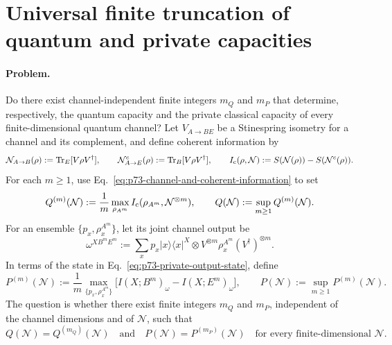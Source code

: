 \section{Universal finite truncation of quantum and private capacities}
\label{sec:problem-73}

\paragraph{Problem.}
Do there exist channel-independent finite integers $m_Q$ and $m_P$ that
determine, respectively, the quantum capacity and the private classical
capacity of every finite-dimensional quantum channel?  Let $V_{A\to BE}$ be
a Stinespring isometry for a channel and its
complement, and define coherent information by
\begin{equation}
  \mathcal N_{A\to B}(\rho):=\operatorname{Tr}_{E}[V\rho V^\dagger],
  \qquad
  \mathcal N^c_{A\to E}(\rho):=\operatorname{Tr}_{B}[V\rho V^\dagger],
  \qquad
  I_{\rm c}(\rho,\mathcal N):=
  S(\mathcal N(\rho))-S(\mathcal N^c(\rho)).
  \label{eq:p73-channel-and-coherent-information}
\end{equation}
For each $m\geq1$, use Eq.~\eqref{eq:p73-channel-and-coherent-information}
to set
\begin{equation}
  Q^{(m)}(\mathcal N)
  :=\frac1m\max_{\rho_{A^m}}
       I_{\rm c}(\rho_{A^m},\mathcal N^{\otimes m}),
  \qquad
  Q(\mathcal N):=\sup_{m\geq1}Q^{(m)}(\mathcal N).
  \label{eq:p73-quantum-regularization}
\end{equation}
For an ensemble $\{p_x,\rho_x^{A^m}\}$, let its joint channel output be
\begin{equation}
  \omega^{XB^mE^m}
  :=\sum_x p_x|x\rangle\!\langle x|^X\otimes
    V^{\otimes m}\rho_x^{A^m}(V^\dagger)^{\otimes m}.
  \label{eq:p73-private-output-state}
\end{equation}
In terms of the state in Eq.~\eqref{eq:p73-private-output-state}, define
\begin{equation}
  P^{(m)}(\mathcal N)
  :=\frac1m\max_{\{p_x,\rho_x^{A^m}\}}
       \bigl[I(X;B^m)_\omega-I(X;E^m)_\omega\bigr],
  \qquad
  P(\mathcal N):=\sup_{m\geq1}P^{(m)}(\mathcal N).
  \label{eq:p73-private-regularization}
\end{equation}
The question is whether there exist finite integers $m_Q$ and $m_P$,
independent of the channel dimensions and of $\mathcal N$, such that
\begin{equation}
  Q(\mathcal N)=Q^{(m_Q)}(\mathcal N)
  \quad\text{and}\quad
  P(\mathcal N)=P^{(m_P)}(\mathcal N)
  \quad\text{for every finite-dimensional }\mathcal N.
  \label{eq:p73-universal-truncations}
\end{equation}

